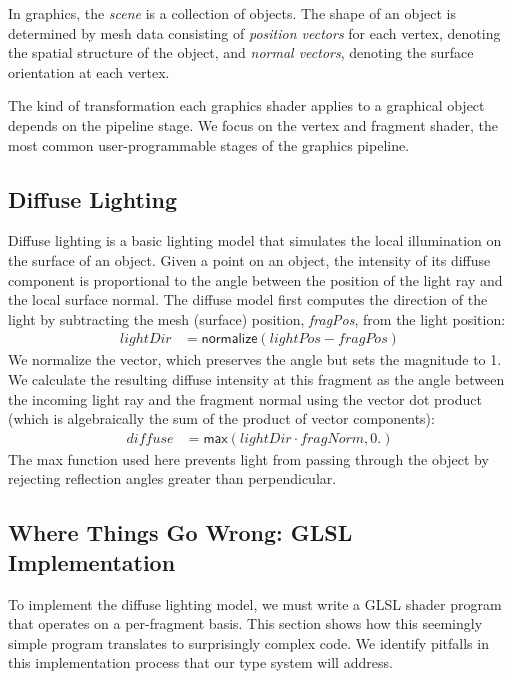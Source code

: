 \documentclass[../main.tex]{subfiles}
\begin{document}
	In graphics, the \emph{scene} is a collection of objects. The shape of an object is determined by mesh data consisting of \emph{position vectors} for each vertex, denoting the spatial structure of the object, and \emph{normal vectors}, denoting the surface orientation at each vertex. 
	
	The kind of transformation each graphics shader applies to a graphical object depends on the pipeline stage. 
	We focus on the vertex and fragment shader, the most common user-programmable stages of the graphics pipeline. 
	
	\subsection{Diffuse Lighting} 
	
	Diffuse lighting is a basic lighting model that simulates the local illumination on the surface of an object.
	Given a point on an object, the intensity of its diffuse component is proportional to the angle between the position of the light ray and the local surface normal. 
	The diffuse model first computes the direction of the light by subtracting the mesh (surface) position, \textit{fragPos}, from the light position:
	\begin{align*}
		\mathit{lightDir} &= \mathsf{normalize}(\mathit{lightPos} - \mathit{fragPos})
	\end{align*}
	We normalize the vector, which preserves the angle but sets the magnitude to 1. 
	We calculate the resulting diffuse intensity at this fragment as the angle between the incoming light ray and the fragment normal using the vector dot product (which is algebraically the sum of the product of vector components):
	\begin{align*}
		\mathit{diffuse} &= \mathsf{max}(\mathit{lightDir}\cdot\mathit{fragNorm}, 0.)
	\end{align*}
	The \textsf{max} function used here prevents light from passing through the object by rejecting reflection angles greater than perpendicular.
	
	\subsection{Where Things Go Wrong: GLSL Implementation}
	\label{subsec:wrong}
	To implement the diffuse lighting model, we must write a GLSL shader program that operates on a per-fragment basis. 
	This section shows how this seemingly simple program translates to surprisingly complex code.
	We identify pitfalls in this implementation process that our type system will address.
	
\end{document}
